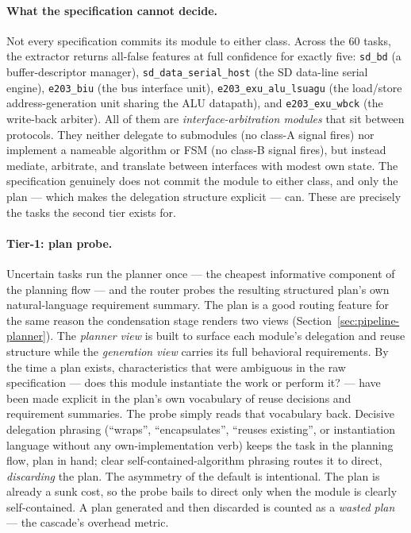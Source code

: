 \paragraph{What the specification cannot decide.}
Not every specification commits its module to either class. Across
the 60 tasks, the extractor returns all-false features at full
confidence for exactly five:
\texttt{sd\_bd} (a buffer-descriptor manager), \texttt{sd\_data\_serial\_host}
(the SD data-line serial engine), \texttt{e203\_biu} (the bus interface
unit), \texttt{e203\_exu\_alu\_lsuagu} (the load/store address-generation
unit sharing the ALU datapath), and \texttt{e203\_exu\_wbck} (the
write-back arbiter). All of them are \emph{interface-arbitration
modules} that sit between protocols. They neither delegate to
submodules (no class-A signal fires) nor implement a nameable algorithm
or FSM (no class-B signal fires), but instead mediate, arbitrate, and
translate between interfaces with modest own state. The specification
genuinely does not commit the module to either class, and only the
plan --- which makes the delegation structure explicit --- can. These
are precisely the tasks the second tier exists for.

\paragraph{Tier-1: plan probe.}
Uncertain tasks run the planner once --- the cheapest informative
component of the planning flow --- and the router probes the resulting structured plan's own
natural-language requirement summary. The plan is a good routing feature
for the same reason the condensation stage renders two views
(Section~\ref{sec:pipeline-planner}). The \emph{planner view} is built
to surface each module's delegation and reuse structure while the
\emph{generation view} carries its full behavioral requirements. By
the time a plan exists, characteristics that were ambiguous in the raw
specification --- does this module instantiate the work or perform it?
--- have been made explicit in the plan's own vocabulary of reuse
decisions and requirement summaries. The probe simply reads that
vocabulary back. Decisive delegation phrasing
(``wraps'', ``encapsulates'', ``reuses existing'', or instantiation language
without any own-implementation verb) keeps the task in the planning flow, plan
in hand; clear self-contained-algorithm phrasing routes it to direct,
\emph{discarding} the plan. The asymmetry of the default is intentional.
The plan is already a sunk cost, so the probe bails to direct only when the
module is clearly self-contained. A plan generated and then discarded is
counted as a \emph{wasted plan} --- the cascade's overhead metric.

